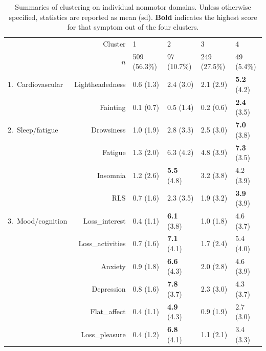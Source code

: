 \documentclass[preprint,3p,twocolumn]{elsarticle} %
\begin{document}
\begin{table}[t]
  \centering
  \caption{Summaries of clustering on individual nonmotor domains. Unless otherwise specified,
    statistics are reported as mean (sd). \textbf{Bold} indicates the highest score for that
  symptom out of the four clusters.}
  \label{tab:nms30}
  \begin{threeparttable}
  \small
\begin{tabular}{lrllll}
  \toprule
    & Cluster & 1 & 2 & 3 & 4 \\
    & $n$ & 509 (56.3\%) & 97 (10.7\%) & 249 (27.5\%) & 49 (5.4\%) \\
  \midrule
  1.\ Cardiovascular &
  Lightheadedness & 0.6 (1.3)\tnote{234} & 2.4 (3.0)\tnote{14} & 2.1 (2.9)\tnote{14} & \textbf{5.2}
  (4.2)\tnote{123} \\
  &Fainting & 0.1 (0.7)\tnote{24} & 0.5 (1.4)\tnote{134} & 0.2 (0.6)\tnote{24} & \textbf{2.4}
  (3.5)\tnote{123} \\
  \midrule
  2.\ Sleep/fatigue &
  Drowsiness & 1.0 (1.9)\tnote{234} & 2.8 (3.3)\tnote{14} & 2.5 (3.0)\tnote{14} & \textbf{7.0}
  (3.8)\tnote{123} \\
  &Fatigue & 1.3 (2.0)\tnote{234} & 6.3 (4.2)\tnote{13} & 4.8 (3.9)\tnote{124} & \textbf{7.3} (3.5)\tnote{13} \\
  &Insomnia & 1.2 (2.6)\tnote{234} & \textbf{5.5} (4.8)\tnote{13} & 3.2 (3.8)\tnote{12} & 4.2
  (3.9)\tnote{1} \\
  &RLS & 0.7 (1.6)\tnote{234} & 2.3 (3.5)\tnote{14} & 1.9 (3.2)\tnote{14} & \textbf{3.9}
  (3.9)\tnote{123} \\
  \midrule
  3.\ Mood/cognition &
  Loss\_interest & 0.4 (1.1)\tnote{234} & \textbf{6.1} (3.8)\tnote{134} & 1.0 (1.8)\tnote{124} & 4.6 (3.7)\tnote{123} \\
  &Loss\_activities & 0.7 (1.6)\tnote{234} & \textbf{7.1} (4.1)\tnote{134} & 1.7 (2.4)\tnote{124} &
  5.4 (4.0)\tnote{123} \\
  &Anxiety & 0.9 (1.8)\tnote{234} & \textbf{6.6} (4.3)\tnote{134} & 2.0 (2.8)\tnote{124} & 4.6 (3.9)\tnote{123} \\
  &Depression & 0.8 (1.6)\tnote{234} & \textbf{7.8} (3.7)\tnote{134} & 2.3 (3.0)\tnote{124} & 4.3 (3.7)\tnote{123} \\
  &Flat\_affect & 0.4 (1.1)\tnote{234} & \textbf{4.9} (4.3)\tnote{134} & 0.9 (1.9)\tnote{124} & 2.7 (3.0)\tnote{123} \\
  &Loss\_pleasure & 0.4 (1.2)\tnote{234} & \textbf{6.8} (4.1)\tnote{134} & 1.1 (2.1)\tnote{124} & 3.4 (3.3)\tnote{123} \\

\end{tabular}
\end{threeparttable}
\end{table}
\end{document}
